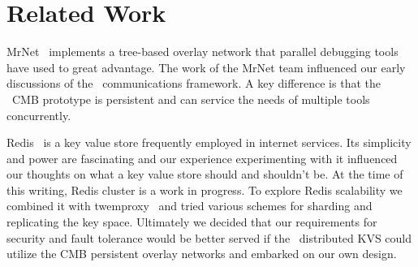 \section{Related Work}

MrNet~\cite{mrnet} implements a tree-based overlay network
that parallel debugging tools have used to great advantage.
The work of the MrNet team influenced our early discussions of the
\flux\ communications framework.  A key difference is that the \flux\ CMB
prototype is persistent and can service the needs of multiple tools
concurrently.

Redis~\cite{Redis} is a key value store frequently employed in internet
services.  Its simplicity and power are fascinating
and our experience experimenting with it influenced our thoughts on
what a key value store should and shouldn't be.  At the time of
this writing, Redis cluster is a work in progress.  To explore
Redis scalability we combined it with twemproxy~\cite{Twemproxy} and
tried various schemes for sharding and replicating the key space.
Ultimately we decided that our requirements for security and fault
tolerance would be better served if the \flux\ distributed KVS could
utilize the CMB persistent overlay networks and embarked on our own design.
